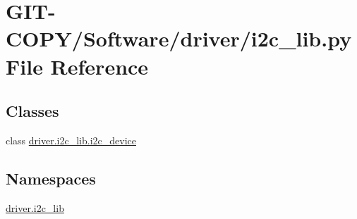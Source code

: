 \hypertarget{GIT-COPY_2Software_2driver_2i2c__lib_8py}{}\section{G\+I\+T-\/\+C\+O\+P\+Y/\+Software/driver/i2c\+\_\+lib.py File Reference}
\label{GIT-COPY_2Software_2driver_2i2c__lib_8py}
\subsection*{Classes}
\begin{DoxyCompactItemize}
\item 
class \hyperlink{classdriver_1_1i2c__lib_1_1i2c__device}{driver.\+i2c\+\_\+lib.\+i2c\+\_\+device}
\end{DoxyCompactItemize}
\subsection*{Namespaces}
\begin{DoxyCompactItemize}
\item 
 \hyperlink{namespacedriver_1_1i2c__lib}{driver.\+i2c\+\_\+lib}
\end{DoxyCompactItemize}
